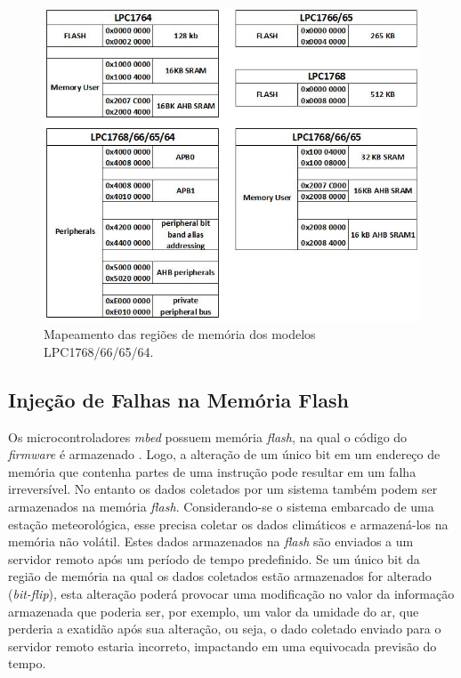 \begin{figure}[H]
	\centering
	\includegraphics[width=1.0\textwidth]{figuras/memoryMap.jpg}
	\caption[Mapas das Regiões de Memória dos Modelos LPC1768/66/65/64]{Mapeamento das regiões de memória dos modelos LPC1768/66/65/64.}
	\label{Img:memoryMap}	
\end{figure}


\subsection{Injeção de Falhas na Memória Flash} \label{subsec:InjecaoFalhasFlash}

Os microcontroladores \textit{mbed} possuem memória \textit{flash}, na qual o código do \textit{firmware} é armazenado \cite{manualLpc176x:2016}. Logo, a alteração de um único bit em um endereço de memória que contenha partes de uma instrução pode resultar em um falha irreversível. No entanto os dados coletados por um sistema também podem ser armazenados na memória \textit{flash}. Considerando-se o sistema embarcado de uma estação meteorológica, esse precisa coletar os dados climáticos e armazená-los na memória não volátil. Estes dados armazenados na \textit{flash} são enviados a um servidor remoto após um período de tempo predefinido. Se um único bit da região de memória na qual os dados coletados estão armazenados for alterado (\textit{bit-flip}), esta alteração poderá provocar uma modificação no valor da informação armazenada que poderia ser, por exemplo, um valor da umidade do ar, que perderia a exatidão após sua alteração, ou seja, o dado coletado enviado para o servidor remoto estaria incorreto, impactando em uma equivocada previsão do tempo. 

